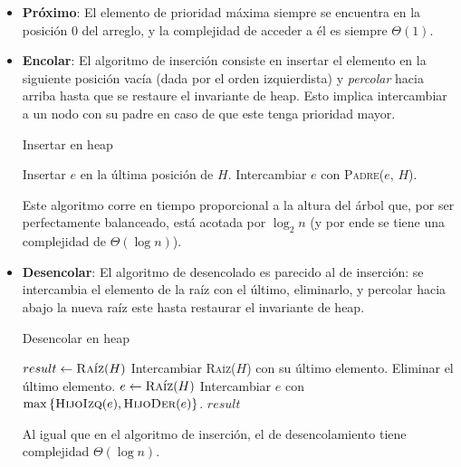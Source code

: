 \documentclass{article}
\newcommand{\BigTheta}[1]{{\Theta(#1)}}
\begin{document}
\begin{itemize}
    \item \textbf{Próximo}: El elemento de prioridad máxima siempre se encuentra en la posición $0$ del arreglo, y la complejidad de acceder a él es siempre $\BigTheta{1}$.
    \item \textbf{Encolar}: El algoritmo de inserción consiste en insertar el elemento en la siguiente posición vacía (dada por el orden izquierdista) y \textit{percolar} hacia arriba hasta que se restaure el invariante de heap. Esto implica intercambiar a un nodo con su padre en caso de que este tenga prioridad mayor.
          \begin{algorithm}[H]
              \caption*{Insertar en heap}
              \begin{algorithmic}
                  \State Insertar $e$ en la última posición de $H$.
                  \State Intercambiar $e$ con \textsc{Padre}($e$, $H$).
                  \EndWhile
                  \EndFunction
              \end{algorithmic}
          \end{algorithm}

          Este algoritmo corre en tiempo proporcional a la altura del árbol que, por ser perfectamente balanceado, está acotada por $\log_2{n}$ (y por ende se tiene una complejidad de $\BigTheta{\log{n}}$).
    \item \textbf{Desencolar}: El algoritmo de desencolado es parecido al de inserción: se intercambia el elemento de la raíz con el último, eliminarlo, y percolar hacia abajo la nueva raíz este hasta restaurar el invariante de heap.
          \begin{algorithm}[H]
              \caption*{Desencolar en heap}
              \begin{algorithmic}
                  \State $result \gets\textsc{Raíz}(H)$
                  \State Intercambiar \textsc{Raíz}($H$) con su último elemento.
                  \State Eliminar el último elemento.
                  \State $e \gets \textsc{Raíz}(H)$
                  \State Intercambiar $e$ con $\max{\{\textsc{HijoIzq}(e), \textsc{HijoDer}(e)\}}$.
                  \EndWhile
                  \State \Return $result$
                  \EndFunction
              \end{algorithmic}
          \end{algorithm}

          Al igual que en el algoritmo de inserción, el de desencolamiento tiene complejidad $\BigTheta{\log{n}}$.
\end{itemize}
\end{document}
